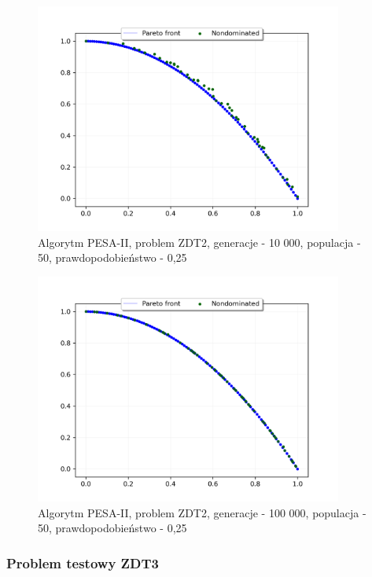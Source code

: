 \documentclass{classrep}
\begin{document}
\begin{figure}[H]
    \centering
    \includegraphics[width=0.9\textwidth]{img2/PESAII_ZDT2_g10000_p50_r0,25.png}
    \caption{Algorytm PESA-II, problem ZDT2, \newline generacje - 10 000, populacja - 50, prawdopodobieństwo - 0,25}
\end{figure}

\begin{figure}[H]
    \centering
    \includegraphics[width=0.9\textwidth]{img2/PESAII_ZDT2_g100000_p50_r0,25.png}
    \caption{Algorytm PESA-II, problem ZDT2, \newline generacje - 100 000, populacja - 50, prawdopodobieństwo - 0,25}
\end{figure}

\subsubsection{Problem testowy ZDT3}
\end{document}
